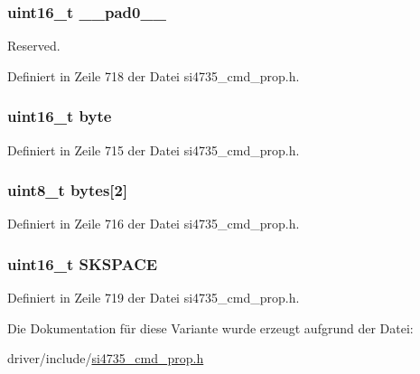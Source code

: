 \subsubsection[{\+\_\+\+\_\+pad0\+\_\+\+\_\+}]{\setlength{\rightskip}{0pt plus 5cm}uint16\+\_\+t \+\_\+\+\_\+pad0\+\_\+\+\_\+}\label{unionfm__seek__freq__spacing_a77132c2c26a75f5b8751b235cda23828}


Reserved. 



Definiert in Zeile 718 der Datei si4735\+\_\+cmd\+\_\+prop.\+h.

\hypertarget{unionfm__seek__freq__spacing_ab0549c1b5ea980a02e7eab77e21fea49}{}
\subsubsection[{byte}]{\setlength{\rightskip}{0pt plus 5cm}uint16\+\_\+t byte}\label{unionfm__seek__freq__spacing_ab0549c1b5ea980a02e7eab77e21fea49}


Definiert in Zeile 715 der Datei si4735\+\_\+cmd\+\_\+prop.\+h.

\hypertarget{unionfm__seek__freq__spacing_a46e4c05d20a047ec169f60d3167e912e}{}
\subsubsection[{bytes}]{\setlength{\rightskip}{0pt plus 5cm}uint8\+\_\+t bytes\mbox{[}2\mbox{]}}\label{unionfm__seek__freq__spacing_a46e4c05d20a047ec169f60d3167e912e}


Definiert in Zeile 716 der Datei si4735\+\_\+cmd\+\_\+prop.\+h.

\hypertarget{unionfm__seek__freq__spacing_a9f1888a9e6cdec1af67bb5764765df0b}{}
\subsubsection[{S\+K\+S\+P\+A\+C\+E}]{\setlength{\rightskip}{0pt plus 5cm}uint16\+\_\+t S\+K\+S\+P\+A\+C\+E}\label{unionfm__seek__freq__spacing_a9f1888a9e6cdec1af67bb5764765df0b}


Definiert in Zeile 719 der Datei si4735\+\_\+cmd\+\_\+prop.\+h.



Die Dokumentation für diese Variante wurde erzeugt aufgrund der Datei\+:\begin{DoxyCompactItemize}
\item 
driver/include/\hyperlink{si4735__cmd__prop_8h}{si4735\+\_\+cmd\+\_\+prop.\+h}\end{DoxyCompactItemize}
